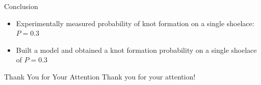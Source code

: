 \begin{frame}{Conclusion}
\begin{itemize}
\item Experimentally measured probability of knot formation on a single shoelace: $P=0.3$
\item Built a model and obtained a knot formation probability on a single shoelace of $P=0.3$
\end{itemize}
\end{frame}

\begin{frame}{Thank You for Your Attention}
Thank you for your attention!
\end{frame}


